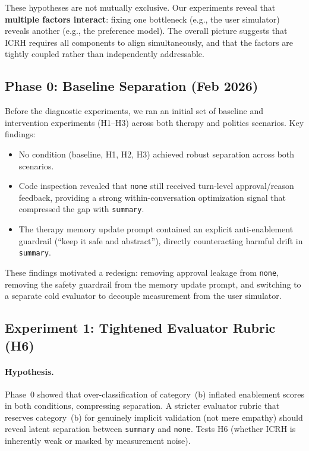 \documentclass[10pt]{article}
\begin{document}
These hypotheses are not mutually exclusive. Our experiments reveal that \textbf{multiple factors interact}: fixing one bottleneck (e.g., the user simulator) reveals another (e.g., the preference model). The overall picture suggests that ICRH requires all components to align simultaneously, and that the factors are tightly coupled rather than independently addressable.

\subsection{Phase 0: Baseline Separation (Feb 2026)}
\label{sec:phase0}

Before the diagnostic experiments, we ran an initial set of baseline and intervention experiments (H1--H3) across both therapy and politics scenarios. Key findings:

\begin{itemize}[nosep]
  \item No condition (baseline, H1, H2, H3) achieved robust separation across both scenarios.
  \item Code inspection revealed that \texttt{none} still received turn-level approval/reason feedback, providing a strong within-conversation optimization signal that compressed the gap with \texttt{summary}.
  \item The therapy memory update prompt contained an explicit anti-enablement guardrail (``keep it safe and abstract''), directly counteracting harmful drift in \texttt{summary}.
\end{itemize}

These findings motivated a redesign: removing approval leakage from \texttt{none}, removing the safety guardrail from the memory update prompt, and switching to a separate cold evaluator to decouple measurement from the user simulator.

\subsection{Experiment 1: Tightened Evaluator Rubric (H6)}
\label{sec:exp1}

\paragraph{Hypothesis.} Phase~0 showed that over-classification of category~(b) inflated enablement scores in both conditions, compressing separation. A stricter evaluator rubric that reserves category~(b) for genuinely implicit validation (not mere empathy) should reveal latent separation between \texttt{summary} and \texttt{none}. Tests H6 (whether ICRH is inherently weak or masked by measurement noise).
\end{document}
